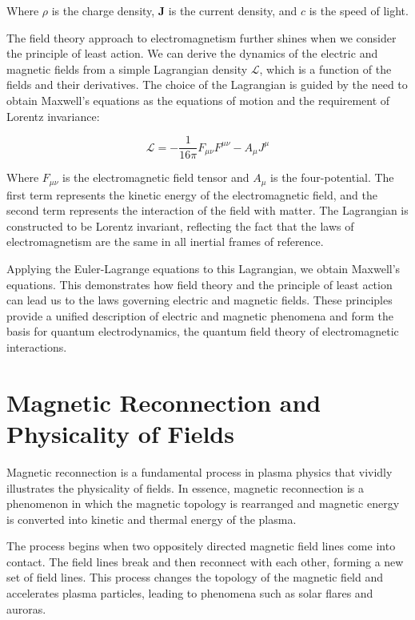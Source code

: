 Where $\rho$ is the charge density, $\mathbf{J}$ is the current density, and $c$ is the speed of light.

The field theory approach to electromagnetism further shines when we consider the principle of least action. We can derive the dynamics of the electric and magnetic fields from a simple Lagrangian density $\mathcal{L}$, which is a function of the fields and their derivatives. The choice of the Lagrangian is guided by the need to obtain Maxwell's equations as the equations of motion and the requirement of Lorentz invariance:

\begin{equation}
    \mathcal{L} = -\frac{1}{16\pi} F_{\mu \nu} F^{\mu \nu} - A_\mu J^\mu
\end{equation}

Where $F_{\mu \nu}$ is the electromagnetic field tensor and $A_\mu$ is the four-potential. The first term represents the kinetic energy of the electromagnetic field, and the second term represents the interaction of the field with matter. The Lagrangian is constructed to be Lorentz invariant, reflecting the fact that the laws of electromagnetism are the same in all inertial frames of reference.

Applying the Euler-Lagrange equations to this Lagrangian, we obtain Maxwell's equations. This demonstrates how field theory and the principle of least action can lead us to the laws governing electric and magnetic fields. These principles provide a unified description of electric and magnetic phenomena and form the basis for quantum electrodynamics, the quantum field theory of electromagnetic interactions.




\section{Magnetic Reconnection and Physicality of Fields}

Magnetic reconnection is a fundamental process in plasma physics that vividly illustrates the physicality of fields. In essence, magnetic reconnection is a phenomenon in which the magnetic topology is rearranged and magnetic energy is converted into kinetic and thermal energy of the plasma.

The process begins when two oppositely directed magnetic field lines come into contact. The field lines break and then reconnect with each other, forming a new set of field lines. This process changes the topology of the magnetic field and accelerates plasma particles, leading to phenomena such as solar flares and auroras.


